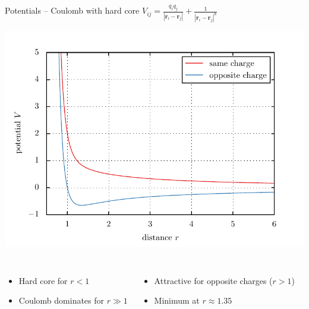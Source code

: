 \documentclass[mathserif,serif]{beamer}
\begin{document}
\begin{frame}{Potentials -- Coulomb with hard core}
	\centering
	$V_{ij} = \frac{q_i q_j}{| \mathbf{r}_i - \mathbf{r}_j |} + \frac{1}{| \mathbf{r}_i - \mathbf{r}_j |^8}$
	
	
	\includegraphics[height=0.5\textheight]{../report/figures/potential_coulomb.pdf}
	\begin{columns}
			\begin{itemize}
				\item Hard core for $r < 1$
				\item Coulomb dominates for $r \gg 1$
			\end{itemize}
			\begin{itemize}
				\item Attractive for opposite charges ($r > 1$)
				\item Minimum at $r\approx 1.35$
			\end{itemize}
	\end{columns}
	
\end{frame}
\end{document}
